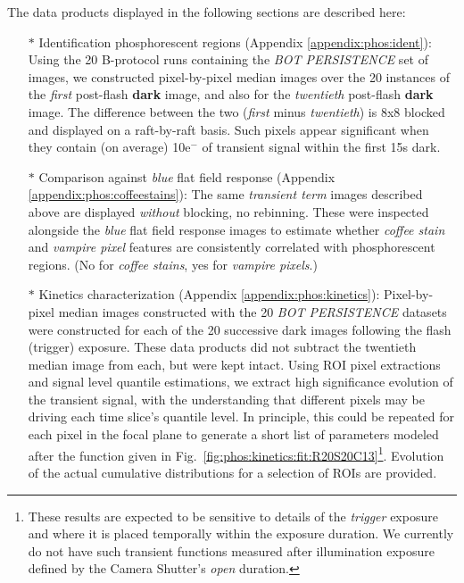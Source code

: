 The data products displayed in the following sections are described here:
\begin{itemize}
    \item[$\ast$] Identification phosphorescent regions (Appendix \ref{appendix:phos:ident}): Using the 20 B-protocol runs containing the {\it BOT PERSISTENCE} set of images, we constructed pixel-by-pixel median images over the 20 instances of the {\it first} post-flash {\bf dark} image, and also for the {\it twentieth} post-flash {\bf dark} image. The difference between the two ({\it first} minus {\it twentieth}) is 8x8 blocked and displayed on a raft-by-raft basis. Such pixels appear significant when they contain (on average) 10e$^-$ of transient signal within the first 15s dark.
    \item[$\ast$] Comparison against {\it blue} flat field response (Appendix \ref{appendix:phos:coffeestains}): The same {\it transient term} images described above are displayed {\it without} blocking, no rebinning. These were inspected alongside the {\it blue} flat field response images to estimate whether {\it coffee stain} and {\it vampire pixel} features are consistently correlated with phosphorescent regions. (No for {\it coffee stains}, yes for {\it vampire pixels}.)
    \item[$\ast$] Kinetics characterization (Appendix \ref{appendix:phos:kinetics}): Pixel-by-pixel median images constructed with the 20 {\it BOT PERSISTENCE} datasets were constructed for each of the 20 successive dark images following the flash (trigger) exposure. These data products did not subtract the twentieth median image from each, but were kept intact. Using ROI pixel extractions and signal level quantile estimations, we extract high significance evolution of the transient signal, with the understanding that different pixels may be driving each time slice's quantile level. In principle, this could be repeated for each pixel in the focal plane to generate a short list of parameters modeled after the function given in Fig.~\ref{fig:phos:kinetics:fit:R20S20C13}\footnote{These results are expected to be sensitive to details of the {\it trigger} exposure and where it is placed temporally within the exposure duration. We currently do not have such transient functions measured after illumination exposure defined by the Camera Shutter's {\it open} duration.}. Evolution of the actual cumulative distributions for a selection of ROIs are provided.

\end{itemize}
